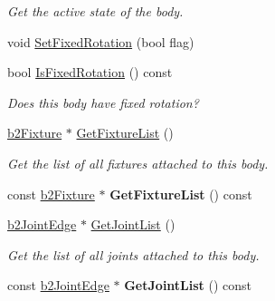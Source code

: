 \begin{DoxyCompactItemize}
\begin{DoxyCompactList}\small\item\em Get the active state of the body. \end{DoxyCompactList}\item 
void \hyperlink{classb2_body_aff35078e2a221d2d05409674936cb8d2}{Set\-Fixed\-Rotation} (bool flag)
\item 
\hypertarget{classb2_body_a6bef51a11a1fec3fddad273b11c14214}{bool \hyperlink{classb2_body_a6bef51a11a1fec3fddad273b11c14214}{Is\-Fixed\-Rotation} () const }\label{classb2_body_a6bef51a11a1fec3fddad273b11c14214}

\begin{DoxyCompactList}\small\item\em Does this body have fixed rotation? \end{DoxyCompactList}\item 
\hypertarget{classb2_body_a64634da20c6e0ab2d68a3cc9ea15efc3}{\hyperlink{classb2_fixture}{b2\-Fixture} $\ast$ \hyperlink{classb2_body_a64634da20c6e0ab2d68a3cc9ea15efc3}{Get\-Fixture\-List} ()}\label{classb2_body_a64634da20c6e0ab2d68a3cc9ea15efc3}

\begin{DoxyCompactList}\small\item\em Get the list of all fixtures attached to this body. \end{DoxyCompactList}\item 
\hypertarget{classb2_body_aa4c739bb2be1d255606e199c1554e2ca}{const \hyperlink{classb2_fixture}{b2\-Fixture} $\ast$ {\bfseries Get\-Fixture\-List} () const }\label{classb2_body_aa4c739bb2be1d255606e199c1554e2ca}

\item 
\hypertarget{classb2_body_a55cf2eb851780599ca5c1f6f25a17e41}{\hyperlink{structb2_joint_edge}{b2\-Joint\-Edge} $\ast$ \hyperlink{classb2_body_a55cf2eb851780599ca5c1f6f25a17e41}{Get\-Joint\-List} ()}\label{classb2_body_a55cf2eb851780599ca5c1f6f25a17e41}

\begin{DoxyCompactList}\small\item\em Get the list of all joints attached to this body. \end{DoxyCompactList}\item 
\hypertarget{classb2_body_afd11fde6189a374716b9d581476d38af}{const \hyperlink{structb2_joint_edge}{b2\-Joint\-Edge} $\ast$ {\bfseries Get\-Joint\-List} () const }\label{classb2_body_afd11fde6189a374716b9d581476d38af}


\end{DoxyCompactItemize}
